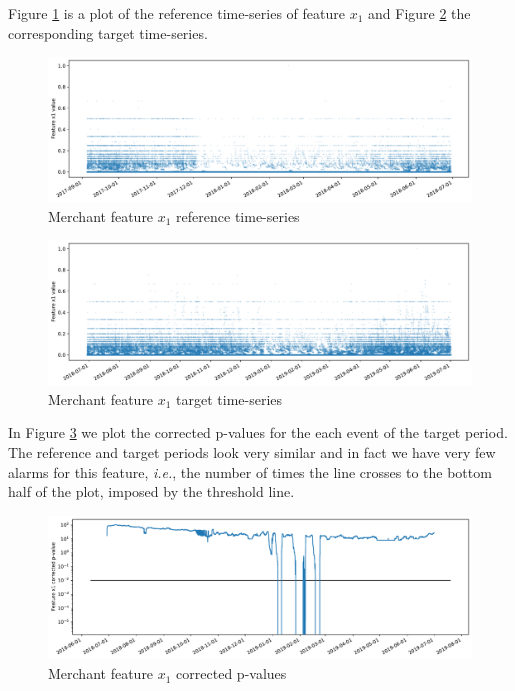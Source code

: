 \documentclass[sigconf]{acmart}
\begin{document}
Figure \ref{fig:merchant-x1-reference} is a plot of the reference time-series of feature $x_1$ and Figure \ref{fig:merchant-x1-target} the corresponding target time-series.
\begin{figure}[!htb]
    \begin{center}
      \includegraphics[scale=0.25]{figures/merchant-x1-reference.pdf}
      \caption{Merchant feature $x_1$ reference time-series}
      \label{fig:merchant-x1-reference}
    \end{center}
\end{figure}
\begin{figure}[!htb]
    \begin{center}
      \includegraphics[scale=0.25]{figures/merchant-x1-target.pdf}
      \caption{Merchant feature $x_1$ target time-series}
      \label{fig:merchant-x1-target}
    \end{center}
\end{figure}
In Figure \ref{fig:merchant-x1-correctedpvalues} we plot the corrected p-values for the each event of the target period. The reference and target periods look very similar and in fact we have very few alarms for this feature, \textit{i.e.}, the number of times the line crosses to the bottom half of the plot, imposed by the threshold line. 
\begin{figure}[!htb]
    \begin{center}
      \includegraphics[scale=0.25]{figures/merchant-x1-correctedpvalues.pdf}
      \caption{Merchant feature $x_1$ corrected p-values}
      \label{fig:merchant-x1-correctedpvalues}
    \end{center}
\end{figure}
\end{document}
